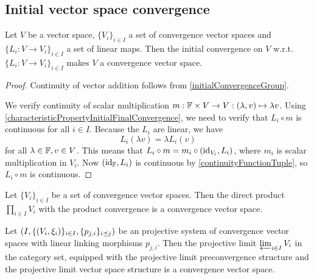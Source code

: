 \subsection{Initial vector space convergence}
\begin{proposition} \label{initialVectorSpaceConvergence}
Let $V$ be a vector space, $\{V_i\}_{i\in I}$ a set of convergence vector spaces and $\{L_i: V \to V_i\}_{i\in I}$ a set of linear maps. Then the initial convergence on $V$ w.r.t. $\{L_i: V \to V_i\}_{i\in I}$ makes $V$ a convergence vector space.
\end{proposition}
\begin{proof}
Continuity of vector addition follows from \ref{initialConvergenceGroup}.

We verify continuity of scalar multiplication $m: \mathbb{F}\times V \to V: (\lambda, v) \mapsto \lambda v$. Using \ref{characteristicPropertyInitialFinalConvergence}, we need to verify that $L_i\circ m$ is continuous for all $i\in I$. Because the $L_i$ are linear, we have
\[ L_i(\lambda v) = \lambda L_i(v) \]
for all $\lambda \in \mathbb{F}, v \in V$. This means that $L_i\circ m = m_i \circ (\operatorname{id}_{V_i}, L_i)$, where $m_i$ is scalar multiplication in $V_i$. Now $(\operatorname{id}_{\mathbb{F}}, L_i)$ is continuous by \ref{continuityFunctionTuple}, so $L_i \circ m$ is continuous.
\end{proof}
\begin{corollary}
Let $\{V_i\}_{i\in I}$ be a set of convergence vector spaces. Then the direct product $\prod_{i\in I} V_i$ with the product convergence is a convergence vector space.
\end{corollary}
\begin{corollary} 
Let $\sSet{I, \{\sSet{V_i, \xi_i}\}_{i\in I}, \{p_{j,i}\}_{i\preceq j}}$ be an projective system of convergence vector spaces with linear linking morphisms $p_{j,i}$. Then the projective limit $\varprojlim_{i\in I} V_i$ in the category set, equipped with the projective limit preconvergence structure and the projective limit vector space structure is a convergence vector space.
\end{corollary}

